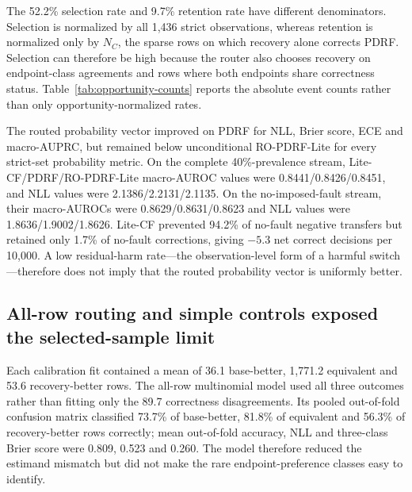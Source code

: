 \documentclass[11pt]{article}
\begin{document}
The 52.2\% selection rate and 9.7\% retention rate have different denominators. Selection is normalized by all 1,436 strict observations, whereas retention is normalized only by $N_C$, the sparse rows on which recovery alone corrects PDRF. Selection can therefore be high because the router also chooses recovery on endpoint-class agreements and rows where both endpoints share correctness status. Table~\ref{tab:opportunity-counts} reports the absolute event counts rather than only opportunity-normalized rates.

\begin{table}[ht]
\centering
\caption{\textbf{Absolute strict-subset opportunities and routed events by mechanism.} $N_C$ and $N_H$ are correction and harm opportunities; $n_C$ and $n_H$ are retained corrections and realized harms. Counts are mean absolute events per 1,436-observation fitted pair, with ranges across 10 fitted pairs in parentheses. Select uses all observations; prevent and retain use $N_H$ and $N_C$, respectively.}
\label{tab:opportunity-counts}
\scriptsize
\resizebox{\textwidth}{!}{}
\end{table}

The routed probability vector improved on PDRF for NLL, Brier score, ECE and macro-AUPRC, but remained below unconditional RO-PDRF-Lite for every strict-set probability metric. On the complete 40\%-prevalence stream, Lite-CF/PDRF/RO-PDRF-Lite macro-AUROC values were 0.8441/0.8426/0.8451, and NLL values were 2.1386/2.2131/2.1135. On the no-imposed-fault stream, their macro-AUROCs were 0.8629/0.8631/0.8623 and NLL values were 1.8636/1.9002/1.8626. Lite-CF prevented 94.2\% of no-fault negative transfers but retained only 1.7\% of no-fault corrections, giving $-5.3$ net correct decisions per 10,000. A low residual-harm rate---the observation-level form of a harmful switch---therefore does not imply that the routed probability vector is uniformly better.

\subsection{All-row routing and simple controls exposed the selected-sample limit}

Each calibration fit contained a mean of 36.1 base-better, 1,771.2 equivalent and 53.6 recovery-better rows. The all-row multinomial model used all three outcomes rather than fitting only the 89.7 correctness disagreements. Its pooled out-of-fold confusion matrix classified 73.7\% of base-better, 81.8\% of equivalent and 56.3\% of recovery-better rows correctly; mean out-of-fold accuracy, NLL and three-class Brier score were 0.809, 0.523 and 0.260. The model therefore reduced the estimand mismatch but did not make the rare endpoint-preference classes easy to identify.
\end{document}
